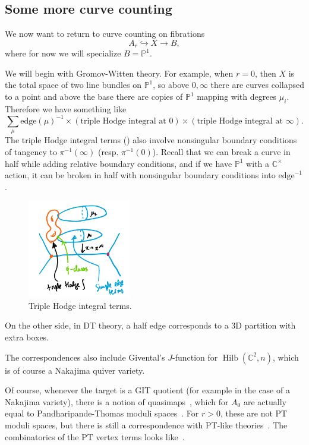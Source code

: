 \documentclass[leqno, openany]{memoir}
\theoremstyle{definition}
\theoremstyle{remark}
\theoremstyle{plain}
\theoremstyle{definition}
\theoremstyle{remark}
\newcommand{\C}{\mathbb{C}}
\renewcommand{\P}{\mathbb{P}}
\newcommand{\mr}[1]{\mathrm{#1}}
\DeclareMathOperator{\Hilb}{Hilb}
\begin{document}
\subsection{Some more curve counting}

We now want to return to curve counting on fibrations
\[ A_r \hookrightarrow X \to B, \]
where for now we will specialize $B = \P^1$.

We will begin with Gromov-Witten theory. For example, when $r = 0$, then $X$ is the total space of two line bundles on $\P^1$, so above $0, \infty$ there are curves collapsed to a point and above the base there are copies of $\P^1$ mapping with degrees $\mu_i$. Therefore we have something like
\[ \sum_{\mu} \mr{edge}(\mu)^{-1} \times (\text{triple Hodge integral at $0$}) \times (\text{triple Hodge integral at $\infty$}). \]
The triple Hodge integral terms () also involve nonsingular boundary conditions of tangency to $\pi^{-1}(\infty)$ (resp. $\pi^{-1}(0)$). Recall that we can break a curve in half while adding relative boundary conditions, and if we have $\P^1$ with a $\C^{\times}$ action, it can be broken in half with nonsingular boundary conditions into $\mr{edge}^{-1}$.

\begin{figure}[h]
    \centering
    \includegraphics[width=0.4\textwidth]{triplehodge}
    \caption{Triple Hodge integral terms.}
    \label{fig:thodge}
\end{figure}

On the other side, in DT theory, a half edge corresponds to a 3D partition with extra boxes. 

The correspondences also include Givental's $J$-function for $\Hilb(\C^2, n)$, which is of course a Nakajima quiver variety.

Of course, whenever the target is a GIT quotient (for example in the case of a Nakajima variety), there is a notion of quasimaps~\cite{qmap}, which for $A_0$ are actually equal to Pandharipande-Thomas moduli spaces~\cite{pcmi}. For $r > 0$, these are not PT moduli spaces, but there is still a correspondence with PT-like theories~\cite{qmapsp}. The combinatorics of the PT vertex terms looks like~.
\end{document}
